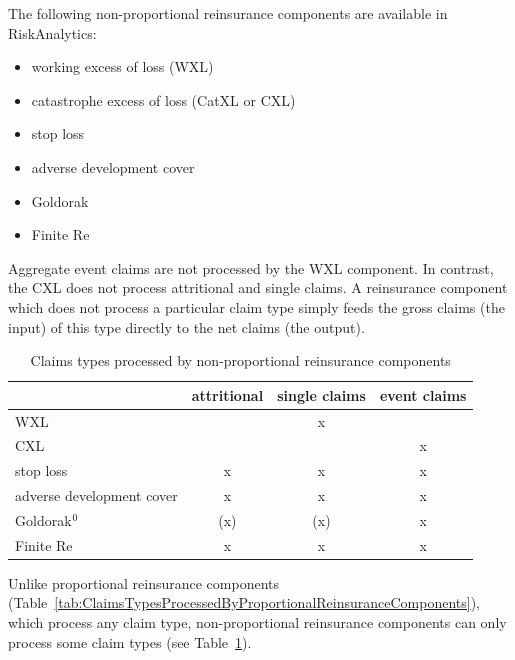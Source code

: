 The following non-proportional reinsurance components are available in RiskAnalytics:
\begin{itemize}
	\item working excess of loss (WXL)
	\item catastrophe excess of loss (CatXL or CXL)
	\item stop loss  %
	\item adverse development cover
	\item Goldorak
	\item Finite Re
\end{itemize}



Aggregate event claims are not processed by the WXL component. In contrast, the CXL does not process attritional and single claims. A reinsurance component which does not process a particular claim type simply feeds the gross claims (the input) of this type directly to the net claims (the output). 

\begin{table}[h]
	\centering
		\begin{tabular}{l|c|c|c|}
		\cline{2-4}
		& attritional & single claims & event claims \\
		\hline \multicolumn{1}{|l|}{WXL}       &   & x &   \\
		\hline \multicolumn{1}{|l|}{CXL}       &   &   & x \\
		\hline \multicolumn{1}{|l|}{stop loss} & x & x & x \\
		\hline \multicolumn{1}{|l|}{adverse development cover} & x & x & x \\
		\hline \multicolumn{1}{|l|}{Goldorak$^{\thefootnote}$} & (x) & (x) & x \\
		\hline \multicolumn{1}{|l|}{Finite Re} & x & x & x \\		
		\hline
		\end{tabular}
	\caption{Claims types processed by non-proportional reinsurance components}
	\label{tab:ClaimsTypesProcessedByNonProportionalReinsuranceComponents}
\end{table}

Unlike proportional reinsurance components (Table~\ref{tab:ClaimsTypesProcessedByProportionalReinsuranceComponents}), which process any claim type, non-proportional reinsurance components can only process some claim types (see Table~\ref{tab:ClaimsTypesProcessedByNonProportionalReinsuranceComponents}).

